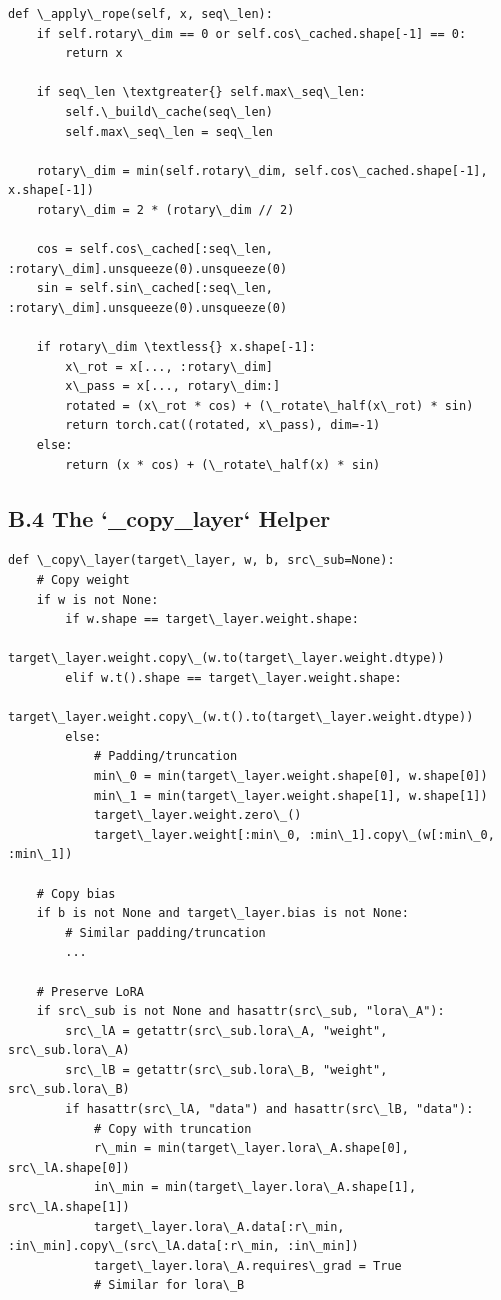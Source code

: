 \begin{lstlisting}
def \_apply\_rope(self, x, seq\_len):
    if self.rotary\_dim == 0 or self.cos\_cached.shape[-1] == 0:
        return x
    
    if seq\_len \textgreater{} self.max\_seq\_len:
        self.\_build\_cache(seq\_len)
        self.max\_seq\_len = seq\_len
    
    rotary\_dim = min(self.rotary\_dim, self.cos\_cached.shape[-1], x.shape[-1])
    rotary\_dim = 2 * (rotary\_dim // 2)
    
    cos = self.cos\_cached[:seq\_len, :rotary\_dim].unsqueeze(0).unsqueeze(0)
    sin = self.sin\_cached[:seq\_len, :rotary\_dim].unsqueeze(0).unsqueeze(0)
    
    if rotary\_dim \textless{} x.shape[-1]:
        x\_rot = x[..., :rotary\_dim]
        x\_pass = x[..., rotary\_dim:]
        rotated = (x\_rot * cos) + (\_rotate\_half(x\_rot) * sin)
        return torch.cat((rotated, x\_pass), dim=-1)
    else:
        return (x * cos) + (\_rotate\_half(x) * sin)
\end{lstlisting}

\subsection{B.4 The `\_copy\_layer` Helper}

\begin{lstlisting}
def \_copy\_layer(target\_layer, w, b, src\_sub=None):
    # Copy weight
    if w is not None:
        if w.shape == target\_layer.weight.shape:
            target\_layer.weight.copy\_(w.to(target\_layer.weight.dtype))
        elif w.t().shape == target\_layer.weight.shape:
            target\_layer.weight.copy\_(w.t().to(target\_layer.weight.dtype))
        else:
            # Padding/truncation
            min\_0 = min(target\_layer.weight.shape[0], w.shape[0])
            min\_1 = min(target\_layer.weight.shape[1], w.shape[1])
            target\_layer.weight.zero\_()
            target\_layer.weight[:min\_0, :min\_1].copy\_(w[:min\_0, :min\_1])
    
    # Copy bias
    if b is not None and target\_layer.bias is not None:
        # Similar padding/truncation
        ...
    
    # Preserve LoRA
    if src\_sub is not None and hasattr(src\_sub, "lora\_A"):
        src\_lA = getattr(src\_sub.lora\_A, "weight", src\_sub.lora\_A)
        src\_lB = getattr(src\_sub.lora\_B, "weight", src\_sub.lora\_B)
        if hasattr(src\_lA, "data") and hasattr(src\_lB, "data"):
            # Copy with truncation
            r\_min = min(target\_layer.lora\_A.shape[0], src\_lA.shape[0])
            in\_min = min(target\_layer.lora\_A.shape[1], src\_lA.shape[1])
            target\_layer.lora\_A.data[:r\_min, :in\_min].copy\_(src\_lA.data[:r\_min, :in\_min])
            target\_layer.lora\_A.requires\_grad = True
            # Similar for lora\_B
\end{lstlisting}

